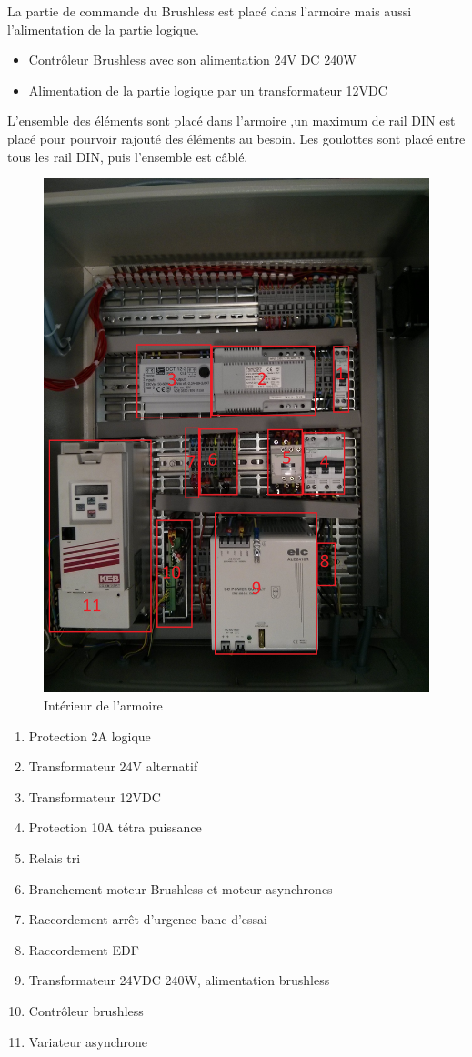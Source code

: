 \documentclass[11pt]{article}
\begin{document}
La partie de commande du Brushless est placé dans l'armoire mais aussi l'alimentation de la partie logique.

\begin{itemize}
	\item Contrôleur Brushless avec son alimentation 24V DC 240W
	\item Alimentation de la partie logique par un transformateur 12VDC
\end{itemize}

L'ensemble des éléments sont placé dans l'armoire ,un maximum de rail DIN est placé pour pourvoir rajouté des éléments au besoin. Les goulottes sont placé entre tous les rail DIN, puis l'ensemble est câblé. 

\begin{figure}[!h]
    \centering
    \includegraphics[width=450px]{IMG_20160629_193634.jpg}
    \caption{Intérieur de l'armoire}
\end{figure}
\FloatBarrier
\begin{enumerate}
	\item Protection 2A logique
	\item Transformateur 24V alternatif
	\item Transformateur 12VDC
	\item Protection 10A tétra puissance
	\item Relais tri
	\item Branchement moteur Brushless et moteur asynchrones
	\item Raccordement arrêt d'urgence banc d'essai
	\item Raccordement EDF
	\item Transformateur 24VDC 240W, alimentation brushless
	\item Contrôleur brushless
	\item Variateur asynchrone
\end{enumerate}
\end{document}
